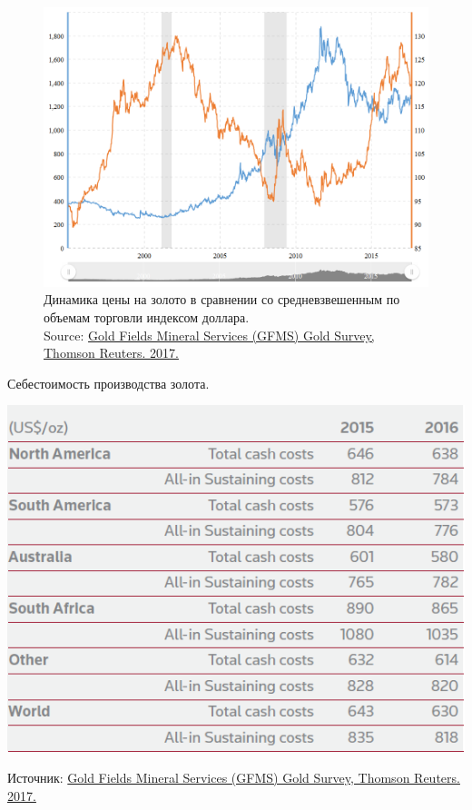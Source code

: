 \documentclass[_Banking_p3.tex]{subfiles}
\begin{document}
\begin{frame}[shrink=20]
\begin{figure}	
	\centering
	\includegraphics[scale=0.4]{img/gold_price_dollar_index.png}
	\caption{Динамика цены на золото в сравнении со средневзвешенным по объемам торговли индексом доллара. \\Source: \href{http://financial-risk-solutions.thomsonreuters.info/GFMS}{Gold Fields Mineral Services (GFMS) Gold Survey, Thomson Reuters. 2017.}}
	\label{fig:gold_price_dollar_index}
\end{figure}
\end{frame}

\begin{frame}{}
\begin{table}	
	\centering
	\caption{Себестоимость производства золота.}
	\includegraphics[scale=0.5]{img/gold_costs.png}
	\label{fig:gold_costs}
\end{table}
Источник: \href{http://financial-risk-solutions.thomsonreuters.info/GFMS}{Gold Fields Mineral Services (GFMS) Gold Survey, Thomson Reuters. 2017.}
\end{frame}
\end{document}
